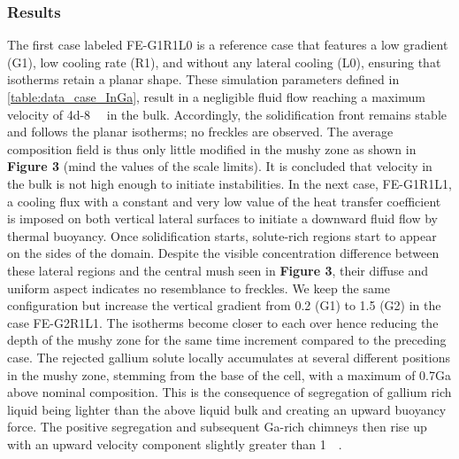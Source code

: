 \subsubsection{Results}
The first case labeled FE-G1R1L0 is a reference case that features a low gradient (G1), low cooling rate (R1), 
and without any lateral cooling (L0), ensuring that isotherms retain a planar shape. These simulation parameters 
defined in \cref{table:data_case_InGa}, result in a negligible fluid flow reaching a maximum velocity of \SI{4d-8}{\milli\uvelocity} in the bulk. 
Accordingly, the solidification front remains stable and follows the planar isotherms; no freckles are observed. 
The average composition field is thus only little modified in the mushy zone as shown in \textbf{Figure 3 }(mind the values of the scale limits). 
It is concluded that velocity in the bulk is not high enough to initiate instabilities. In the next case, FE-G1R1L1, 
a cooling flux with a constant and very low value of the heat transfer coefficient is imposed on both vertical lateral 
surfaces to initiate a downward fluid flow by thermal buoyancy. Once solidification starts, solute-rich regions start 
to appear on the sides of the domain. Despite the visible concentration difference between these lateral regions and 
the central mush seen in \textbf{Figure 3}, their diffuse and uniform aspect indicates no resemblance to freckles. We keep the 
same configuration but increase the vertical gradient from \SI{0.2}{\ugradT} (G1) to \SI{1.5}{\ugradT} (G2) in the case FE-G2R1L1. 
The isotherms become closer to each over hence reducing the depth of the mushy zone for the same time increment compared 
to the preceding case. The rejected gallium solute locally accumulates at several different positions in the mushy zone, 
stemming from the base of the cell, with a maximum of \SI{0.7}{\ucomposition}Ga above nominal composition. 
This is the consequence of segregation of gallium rich liquid being lighter than the above liquid bulk and creating an 
upward buoyancy force. The positive segregation and subsequent Ga-rich chimneys then rise up with an upward velocity 
component slightly greater than \SI{1}{\milli\uvelocity}.
%

